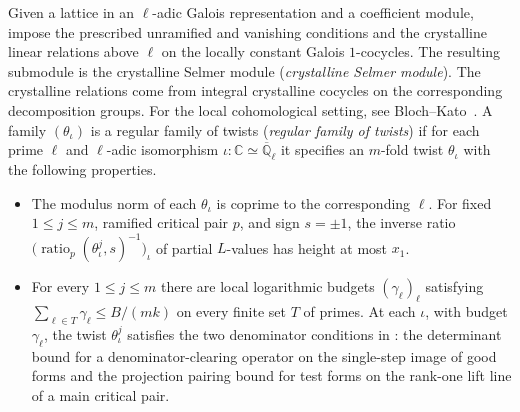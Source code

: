 \begin{definition}
\label{def:regular-twist-family}
\emitthmsource
Given a lattice in an $\ell$-adic Galois representation and a coefficient module, impose the prescribed unramified and vanishing conditions and the crystalline linear relations above $\ell$ on the locally constant Galois $1$-cocycles. The resulting submodule is the crystalline Selmer module (\emph{crystalline Selmer module}). The crystalline relations come from integral crystalline cocycles on the corresponding decomposition groups. For the local cohomological setting, see Bloch--Kato~\cite[\S~3]{BlochKato1990}.
A family $(\theta_\iota)$ is a regular family of twists (\emph{regular family of twists}) if for each prime $\ell$ and $\ell$-adic isomorphism $\iota\colon\mathbb C\simeq\overline{\mathbb Q}_\ell$ it specifies an $m$-fold twist $\theta_\iota$ with the following properties.
\begin{itemize}
\item The modulus norm of each $\theta_\iota$ is coprime to the corresponding $\ell$. For fixed $1\le j\le m$, ramified critical pair $p$, and sign $s=\pm1$, the inverse ratio $\bigl(\operatorname{ratio}_p(\theta_\iota^j,s)^{-1}\bigr)_\iota$ of partial $L$-values has height at most $x_1$.
\item For every $1\le j\le m$ there are local logarithmic budgets $(\gamma_\ell)_\ell$ satisfying $\sum_{\ell\in T}\gamma_\ell\le B/(mk)$ on every finite set $T$ of primes. At each $\iota$, with budget $\gamma_\ell$, the twist $\theta_\iota^j$ satisfies the two denominator conditions in : the determinant bound for a denominator-clearing operator on the single-step image of good forms and the projection pairing bound for test forms on the rank-one lift line of a main critical pair.
\end{itemize}
\end{definition}

